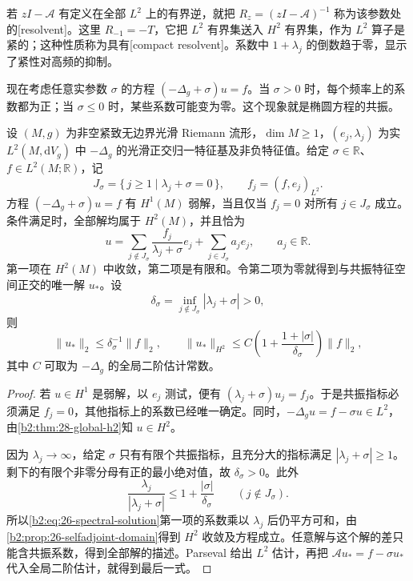若 \(zI-\mathcal A\) 有定义在全部 \(L^2\) 上的有界逆，就把 \(R_z=(zI-\mathcal A)^{-1}\) 称为该参数处的[resolvent]。这里 \(R_{-1}=-T\)，它把 \(L^2\) 有界集送入 \(H^2\) 有界集，作为 \(L^2\) 算子是紧的；这种性质称为具有[compact resolvent]。系数中 \(1+\lambda_j\) 的倒数趋于零，显示了紧性对高频的抑制。

\ProseParagraphBreak

现在考虑任意实参数 \(\sigma\) 的方程 \((-\Delta_g+\sigma)u=f\)。当 \(\sigma>0\) 时，每个频率上的系数都为正；当 \(\sigma\leq0\) 时，某些系数可能变为零。这个现象就是椭圆方程的共振。

\begin{theorem}[谱解与共振相容性]\label{b2:thm:26-spectral-solvability}
设 \((M,g)\) 为非空紧致无边界光滑 Riemann 流形，\(\dim M\geq1\)，\((e_j,\lambda_j)\) 为实 \(L^2(M,\mathrm dV_g)\) 中 \(-\Delta_g\) 的光滑正交归一特征基及非负特征值。给定 \(\sigma\in\mathbb R\)、\(f\in L^2(M;\mathbb R)\)，记
\[
 J_\sigma=\{\,j\geq1\mid\lambda_j+\sigma=0\,\},\qquad f_j=(f,e_j)_{L^2}.
\]
方程 \((-\Delta_g+\sigma)u=f\) 有 \(H^1(M)\) 弱解，当且仅当 \(f_j=0\) 对所有 \(j\in J_\sigma\) 成立。条件满足时，全部解均属于 \(H^2(M)\)，并且恰为
\begin{equation}\label{b2:eq:26-spectral-solution}
 u=\sum_{j\notin J_\sigma}\frac{f_j}{\lambda_j+\sigma}e_j
       +\sum_{j\in J_\sigma}a_je_j,\qquad a_j\in\mathbb R.
\end{equation}
第一项在 \(H^2(M)\) 中收敛，第二项是有限和。令第二项为零就得到与共振特征空间正交的唯一解 \(u_*\)。设
\[
 \delta_\sigma=\inf_{j\notin J_\sigma}|\lambda_j+\sigma|>0,
\]
则
\[
 \|u_*\|_2\leq\delta_\sigma^{-1}\|f\|_2,\qquad
 \|u_*\|_{H^2}\leq C\left(1+\frac{1+|\sigma|}{\delta_\sigma}\right)\|f\|_2,
\]
其中 \(C\) 可取为 \(-\Delta_g\) 的全局二阶估计常数。
\end{theorem}
\begin{proof}
若 \(u\in H^1\) 是弱解，以 \(e_j\) 测试，便有
\((\lambda_j+\sigma)u_j=f_j\)。于是共振指标必须满足 \(f_j=0\)，其他指标上的系数已经唯一确定。同时，\(-\Delta_g u=f-\sigma u\in L^2\)，由\cref{b2:thm:28-global-h2}知 \(u\in H^2\)。

因为 \(\lambda_j\to\infty\)，给定 \(\sigma\) 只有有限个共振指标，且充分大的指标满足 \(|\lambda_j+\sigma|\geq1\)。剩下的有限个非零分母有正的最小绝对值，故 \(\delta_\sigma>0\)。此外
\[
 \frac{\lambda_j}{|\lambda_j+\sigma|}
 \leq1+\frac{|\sigma|}{\delta_\sigma}\qquad(j\notin J_\sigma).
\]
所以\eqref{b2:eq:26-spectral-solution}第一项的系数乘以 \(\lambda_j\) 后仍平方可和，由\cref{b2:prop:26-selfadjoint-domain}得到 \(H^2\) 收敛及方程成立。任意解与这个解的差只能含共振系数，得到全部解的描述。Parseval 给出 \(L^2\) 估计，再把 \(\mathcal Au_*=f-\sigma u_*\) 代入全局二阶估计，就得到最后一式。
\end{proof}

